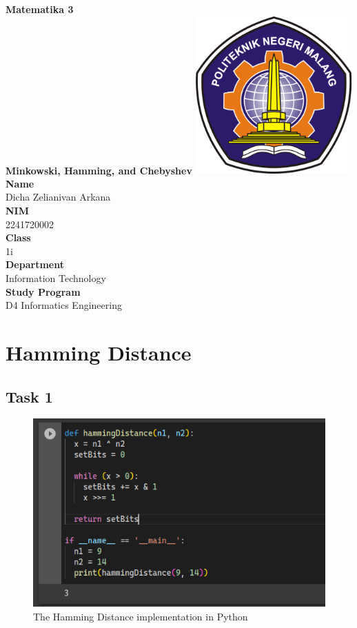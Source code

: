 \documentclass[12pt,titlepage]{article}
\newcommand{\vSubject}{Matematika 3}
\newcommand{\vSubtitle}{Minkowski, Hamming, and Chebyshev}
\newcommand{\vName}{Dicha Zelianivan Arkana}
\newcommand{\vNIM}{2241720002}
\newcommand{\vClass}{1i}
\newcommand{\vDepartment}{Information Technology}
\newcommand{\vStudyProgram}{D4 Informatics Engineering}
\begin{document}
\begin{titlepage}
    \centering
    \vfill
    {\bfseries\LARGE
        \vSubject\\
        \vskip0.25cm
        \vSubtitle
    }
    \vfill
    \includegraphics[width=6cm]{images/polinema-logo.png}
    \vfill
    {
        \textbf{Name}\\
        \vName\\
        \vskip0.5cm
        \textbf{NIM}\\
        \vNIM\\
        \vskip0.5cm
        \textbf{Class}\\
        \vClass\\
        \vskip0.5cm
        \textbf{Department}\\
        \vDepartment\\
        \vskip0.5cm
        \textbf{Study Program}\\
        \vStudyProgram
    }
\end{titlepage}

\section{Hamming Distance}

\subsection{Task 1}
\begin{figure}[h]
    \centering
    \includegraphics[width=.6\textwidth]{./images/hamming.png}
    \caption{The Hamming Distance implementation in Python}
\end{figure}
\end{document}
